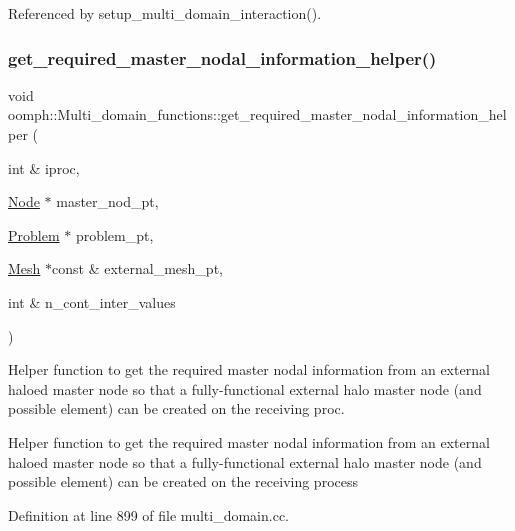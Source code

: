 Referenced by setup\+\_\+multi\+\_\+domain\+\_\+interaction().

\mbox{\label{namespaceoomph_1_1Multi__domain__functions_a3b08cda68388e72b4159bbc0fa0826ee}} 
\subsubsection{\texorpdfstring{get\+\_\+required\+\_\+master\+\_\+nodal\+\_\+information\+\_\+helper()}{get\_required\_master\_nodal\_information\_helper()}}
{\footnotesize\ttfamily void oomph\+::\+Multi\+\_\+domain\+\_\+functions\+::get\+\_\+required\+\_\+master\+\_\+nodal\+\_\+information\+\_\+helper (\begin{DoxyParamCaption}\item[{int \&}]{iproc,  }\item[{\hyperlink{classoomph_1_1Node}{Node} $\ast$}]{master\+\_\+nod\+\_\+pt,  }\item[{\hyperlink{classoomph_1_1Problem}{Problem} $\ast$}]{problem\+\_\+pt,  }\item[{\hyperlink{classoomph_1_1Mesh}{Mesh} $\ast$const \&}]{external\+\_\+mesh\+\_\+pt,  }\item[{int \&}]{n\+\_\+cont\+\_\+inter\+\_\+values }\end{DoxyParamCaption})}



Helper function to get the required master nodal information from an external haloed master node so that a fully-\/functional external halo master node (and possible element) can be created on the receiving proc. 

Helper function to get the required master nodal information from an external haloed master node so that a fully-\/functional external halo master node (and possible element) can be created on the receiving process 

Definition at line 899 of file multi\+\_\+domain.\+cc.



